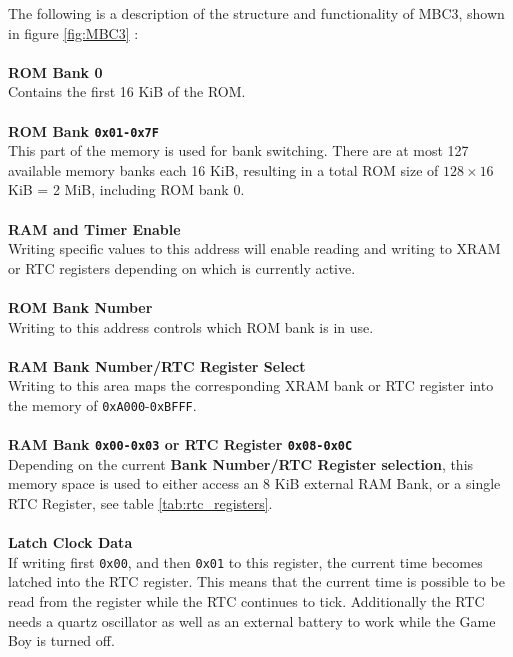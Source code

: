 The following is a description of the structure and functionality of MBC3, shown in figure \ref{fig:MBC3} \cite{GBWikiMBC}:
\\\\
\textbf{ROM Bank 0 }
\\
Contains the first 16 KiB of the ROM.
\\\\
\textbf{ROM Bank \texttt{0x01-0x7F}}
\\
This part of the memory is used for bank switching. There are at most 127 available memory banks each 16 KiB, resulting in a total ROM size of $128 \times 16$ KiB = 2 MiB, including ROM bank 0.
\\\\
\textbf{RAM and Timer Enable}
\\
Writing specific values to this address will enable reading and writing to XRAM or RTC registers depending on which is currently active.
\\\\
\textbf{ROM Bank Number}
\\
Writing to this address controls which ROM bank is in use.
\\\\
\textbf{RAM Bank Number/RTC Register Select}
\\
Writing to this area maps the corresponding XRAM bank or RTC register into the memory of \texttt{0xA000}-\texttt{0xBFFF}. 
\\\\
\textbf{RAM Bank \texttt{0x00-0x03} or RTC Register \texttt{0x08-0x0C}}
\\
Depending on the current \textbf{Bank Number/RTC Register selection}, this memory space is used to either access an 8 KiB external RAM Bank, or a single RTC Register, see table \ref{tab:rtc_registers}.
\\\\
\textbf{Latch Clock Data}
\\
If writing first \texttt{0x00}, and then \texttt{0x01} to this register, the current time becomes latched into the RTC register. This means that the current time is possible to be read from the register while the RTC continues to tick. Additionally the RTC needs a quartz oscillator as well as an external battery to work while the Game Boy is turned off. 
\\\\
